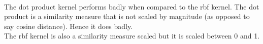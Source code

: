 \begin{answer}\\
The dot product kernel performs badly when compared to the rbf kernel. The dot product is a similarity measure that is not scaled by magnitude (as opposed to say cosine distance). Hence it does badly.\\
The rbf kernel is also a similarity measure scaled but it is scaled between 0 and 1.\\
\end{answer}
